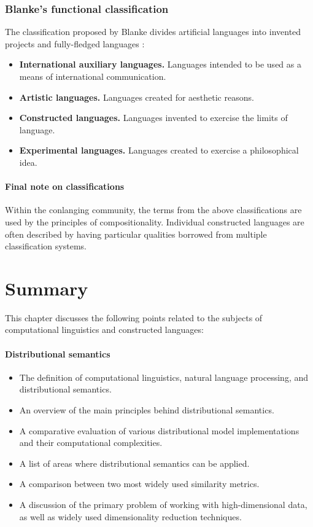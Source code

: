 \documentclass[14pt, a4paper]{extreport}
\begin{document}
      \subsubsection{Blanke's functional classification}
The classification proposed by Blanke divides artificial languages into invented projects and fully-fledged languages \parencite{stria}:

\begin{itemize}
  \item \textbf{International auxiliary languages.} Languages intended to be used as a means of international communication.
  \item \textbf{Artistic languages.} Languages created for aesthetic reasons.
  \item \textbf{Constructed languages.} Languages invented to exercise the limits of language.
  \item \textbf{Experimental languages.} Languages created to exercise a philosophical idea.
\end{itemize}
        \bigskip
        \paragraph{Final note on classifications}
Within the conlanging community, the terms from the above classifications are used by the principles of compositionality. Individual constructed languages are often described by having particular qualities borrowed from multiple classification systems.
    \section{Summary}

This chapter discusses the following points related to the subjects of computational linguistics and constructed languages:

\paragraph{Distributional semantics}

\begin{itemize}
  \item The definition of computational linguistics, natural language processing, and distributional semantics.
  \item An overview of the main principles behind distributional semantics.
  \item A comparative evaluation of various distributional model implementations and their computational complexities.
  \item A list of areas where distributional semantics can be applied.
  \item A comparison between two most widely used similarity metrics.
  \item A discussion of the primary problem of working with high-dimensional data, as well as widely used dimensionality reduction techniques.
\end{itemize}
\end{document}
